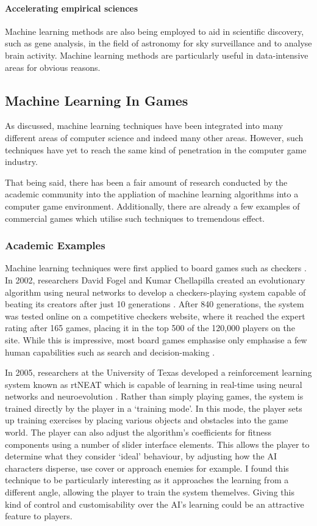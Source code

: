\documentclass[a4paper,oneside]{report}
\begin{document}
\paragraph{Accelerating empirical sciences} Machine learning methods are also being employed to aid in scientific discovery, such as gene analysis, in the field of astronomy for sky surveillance and to analyse brain activity. Machine learning methods are particularly useful in data-intensive areas for obvious reasons.

\subsection{Machine Learning In Games}

As discussed, machine learning techniques have been integrated into many different areas of computer science and indeed many other areas. However, such techniques have yet to reach the same kind of penetration in the computer game industry.

That being said, there has been a fair amount of research conducted by the academic community into the appliation of machine learning algorithms into a computer game environment. Additionally, there are already a few examples of commercial games which utilise such techniques to tremendous effect. 

\subsubsection{Academic Examples}

Machine learning techniques were first applied to board games such as checkers \cite{Samuel:1959qo, Samuel:1967ye}. In 2002, researchers David Fogel and Kumar Chellapilla created an evolutionary algorithm using neural networks to develop a checkers-playing system capable of beating its creators after just 10 generations \cite{Fogel:2003fk}. After 840 generations, the system was tested online on a competitive checkers website, where it reached the expert rating after 165 games, placing it in the top 500 of the 120,000 players on the site. While this is impressive, most board games emphasise only emphasise a few human capabilities such as search and decision-making \cite{Laird:2001tw}. 

In 2005, researchers at the University of Texas developed a reinforcement learning system known as rtNEAT which is capable of learning in real-time using neural networks and neuroevolution \cite{Stanley:2005ff}. Rather than simply playing games, the system is trained directly by the player in a `training mode'. In this mode, the player sets up training exercises by placing various objects and obstacles into the game world. The player can also adjust the algorithm's coefficients for fitness components using a number of slider interface elements. This allows the player to determine what they consider `ideal' behaviour, by adjusting how the AI characters disperse, use cover or approach enemies for example. I found this technique to be particularly interesting as it approaches the learning from a different angle, allowing the player to train the system themelves. Giving this kind of control and customisability over the AI's learning could be an attractive feature to players. 
\end{document}
